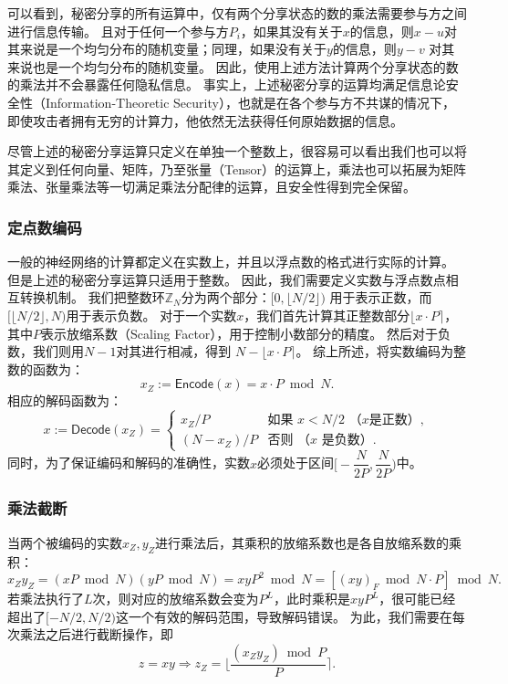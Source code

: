 可以看到，秘密分享的所有运算中，仅有两个分享状态的数的乘法需要参与方之间进行信息传输。
%
且对于任何一个参与方$P_i$，如果其没有关于$x$的信息，则$x - u$对其来说是一个均匀分布的随机变量；同理，如果没有关于$y$的信息，则$y - v$ 对其来说也是一个均匀分布的随机变量。
%
因此，使用上述方法计算两个分享状态的数的乘法并不会暴露任何隐私信息。
%
事实上，上述秘密分享的运算均满足信息论安全性（Information-Theoretic Security），也就是在各个参与方不共谋的情况下，即使攻击者拥有无穷的计算力，他依然无法获得任何原始数据的信息\cite{beaver1992efficient}。

尽管上述的秘密分享运算只定义在单独一个整数上，很容易可以看出我们也可以将其定义到任何向量、矩阵，乃至张量（Tensor）的运算上，乘法也可以拓展为矩阵乘法、张量乘法等一切满足乘法分配律的运算，且安全性得到完全保留。

\subsubsection{定点数编码}
一般的神经网络的计算都定义在实数上，并且以浮点数的格式进行实际的计算。
%
但是上述的秘密分享运算只适用于整数。
%
因此，我们需要定义实数与浮点数点相互转换机制。
%
我们把整数环$\mathbb Z_N$分为两个部分：$[0, \lfloor N/2 \rfloor)$ 用于表示正数，而$[\lfloor N/2 \rfloor, N)$用于表示负数。
%
对于一个实数$x$，我们首先计算其正整数部分$\lfloor x\cdot P \rceil$，其中$P$表示放缩系数（Scaling Factor），用于控制小数部分的精度。
%
然后对于负数，我们则用$N - 1$对其进行相减，得到 $N - \lfloor x\cdot P \rceil$。
%
综上所述，将实数编码为整数的函数为：
\begin{equation}
    x_Z := \mathsf{Encode}(x) = x \cdot P \bmod N.
\end{equation}
%
相应的解码函数为：
\begin{equation}
    x := \mathsf{Decode}(x_Z) = \begin{cases}
        x_Z / P         & \text{如果 $x < N/2$ （$x$是正数）}, \\
        (N - x_Z) / P     & \text{否则 （$x$ 是负数）}.
    \end{cases}
\end{equation}
%
同时，为了保证编码和解码的准确性，实数$x$必须处于区间$\big[ -\dfrac{N}{2P}, \dfrac{N}{2P} \big)$中。


\subsubsection{乘法截断}
当两个被编码的实数$x_Z, y_Z$进行乘法后，其乘积的放缩系数也是各自放缩系数的乘积：
\begin{equation}
    x_Zy_Z = (xP \bmod N)(yP \bmod N) = xyP^2 \bmod N = [(xy)_F \bmod N \cdot P] \bmod N.
\end{equation}
%
若乘法执行了$L$次，则对应的放缩系数会变为$P^L$，此时乘积是$xyP^L$，很可能已经超出了$[-N/2, N/2)$这一个有效的解码范围，导致解码错误。
%
为此，我们需要在每次乘法之后进行截断操作，即
\begin{equation}
    z = xy \Rightarrow z_Z = \Big\lfloor \dfrac{(x_Z y_Z) \bmod P}{P} \Big\rceil.
\end{equation}
%

